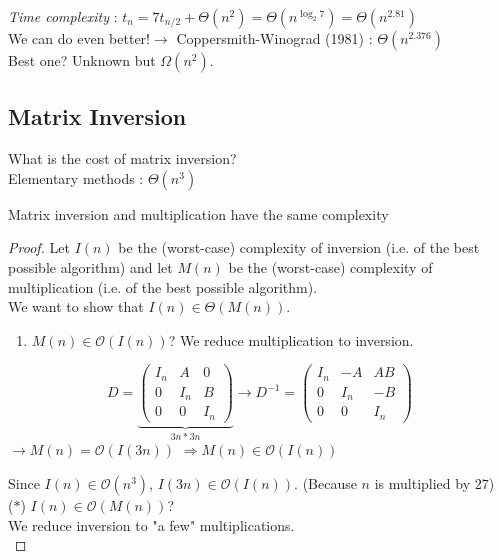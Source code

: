 \emph{Time complexity} : $t_n=7t_{n/2}+\Theta(n^2)=\Theta\left(n^{\log_2 7}\right)=\Theta\left(n^{2.81}\right)$\\
We can do even better!$\rightarrow$ Coppersmith-Winograd (1981) : $\Theta(n^{2.376})$\\
Best one? Unknown but $\Omega(n^2)$.

\subsection{Matrix Inversion}
What is the cost of matrix inversion?\\
Elementary methods : $\Theta(n^3)$
\begin{theorem}
Matrix inversion and multiplication have the same complexity
\end{theorem}
\begin{proof}
Let $I(n)$ be the (worst-case) complexity of inversion (i.e. of the best possible algorithm) and let $M(n)$ be the (worst-case) complexity of multiplication (i.e. of the best possible algorithm).\\
We want to show that $I(n)\in \Theta(M(n))$.
\begin{enumerate}%
\item $M(n)\in \mathcal{O}(I(n))$? We reduce multiplication to inversion.\\
\end{enumerate}
$$D=\underbrace{\begin{pmatrix}
I_n & A & 0\\
0 & I_n & B\\
0 & 0 & I_n
\end{pmatrix}}\limits_{3n*3n}
\rightarrow D^{-1}=\begin{pmatrix}
I_n & -A & AB\\
0 & I_n & -B\\
0 & 0 & I_n
\end{pmatrix} $$
\hspace*{2cm}$\rightarrow M(n)=\mathcal{O}(I(3n))$ \hspace*{4cm} $\Rightarrow M(n) \in \mathcal{O}(I(n))$

Since $I(n) \in \mathcal{O}(n^3)$, $I(3n)\in \mathcal{O}(I(n))$. (Because $n$ is multiplied by $27$)\\

($\ast$)  $I(n)\in \mathcal{O}(M(n))$?\\

We reduce inversion to "a few" multiplications.\\


\end{proof}
